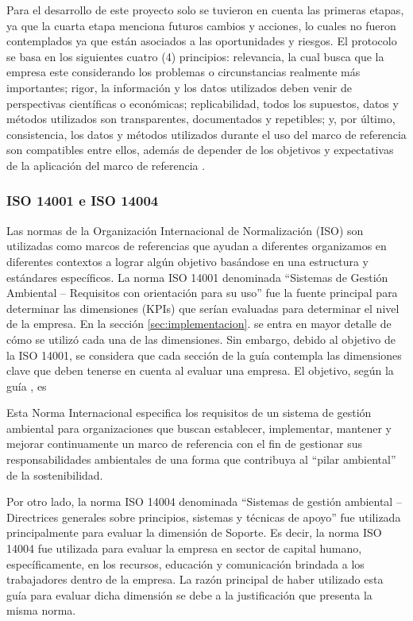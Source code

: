 Para el desarrollo de este proyecto solo se tuvieron en cuenta las primeras etapas, ya que la cuarta etapa menciona futuros cambios y acciones, lo cuales no fueron contemplados ya que están asociados a las oportunidades y riesgos. El protocolo se basa en los siguientes cuatro (4) principios: relevancia, la cual busca que la empresa este considerando los problemas o circunstancias realmente más importantes; rigor, la información y los datos utilizados deben venir de perspectivas científicas o económicas; replicabilidad, todos los supuestos, datos y métodos utilizados son transparentes, documentados y repetibles; y, por último, consistencia, los datos y métodos utilizados durante el uso del marco de referencia son compatibles entre ellos, además de depender de los objetivos y expectativas de la aplicación del marco de referencia \parencite{capitals-coalition-2021}.



\subsubsection{ISO 14001 e ISO 14004}
Las normas de la Organización Internacional de Normalización (ISO) son utilizadas como marcos de referencias que ayudan a diferentes organizamos en diferentes contextos a lograr algún objetivo basándose en una estructura y estándares específicos. La norma ISO 14001 denominada “Sistemas de Gestión Ambiental – Requisitos con orientación para su uso” \parencite{iso-2015} fue la fuente principal para determinar las dimensiones (KPIs) que serían evaluadas para determinar el nivel de la empresa. En la sección \ref{sec:implementacion}.  se entra en mayor detalle de cómo se utilizó cada una de las dimensiones. Sin embargo, debido al objetivo de la ISO 14001, se considera que cada sección de la guía contempla las dimensiones clave que deben tenerse en cuenta al evaluar una empresa. El objetivo, según la guía \textcite{iso-2015}, es

\hfill
\par
\leftskip=0.35in \rightskip=0.35in
Esta Norma Internacional especifica los requisitos de un sistema de gestión ambiental para organizaciones que buscan establecer, implementar, mantener y mejorar continuamente un marco de referencia con el fin de gestionar sus responsabilidades ambientales de una forma que contribuya al “pilar ambiental” de la sostenibilidad.

\hfill
\par
\leftskip=0in \rightskip=0in
Por otro lado, la norma  ISO 14004 denominada “Sistemas de gestión ambiental – Directrices generales sobre principios, sistemas y técnicas de apoyo” \parencite{iso-2004} fue utilizada principalmente para evaluar la dimensión de Soporte. Es decir, la norma ISO 14004 fue utilizada para evaluar la empresa en sector de capital humano, específicamente, en los recursos, educación y comunicación brindada a los trabajadores dentro de la empresa. La razón principal de haber utilizado esta guía para evaluar dicha dimensión se debe a la justificación que presenta la misma norma. 

